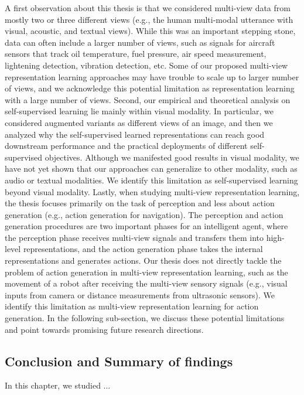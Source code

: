 A first observation about this thesis is that we considered multi-view data from mostly two or three different
views (e.g., the human multi-modal utterance with visual, acoustic, and textual views). While this was
an important stepping stone, data can often include a larger number of views, such as signals for aircraft
sensors that track oil temperature, fuel pressure, air speed measurement, lightening detection, vibration
detection, etc. Some of our proposed multi-view representation learning approaches may have trouble to
scale up to larger number of views, and we acknowledge this potential limitation as representation learning
with a large number of views. Second, our empirical and theoretical analysis on self-supervised learning lie
mainly within visual modality. In particular, we considered augmented variants as different views of an
image, and then we analyzed why the self-supervised learned representations can reach good downstream
performance and the practical deployments of different self-supervised objectives. Although we manifested
good results in visual modality, we have not yet shown that our approaches can generalize to other modality,
such as audio or textual modalities. We identify this limitation as self-supervised learning beyond visual
modality. Lastly, when studying multi-view representation learning, the thesis focuses primarily on the task
of perception and less about action generation (e.g., action generation for navigation). The perception and
action generation procedures are two important phases for an intelligent agent, where the perception phase
receives multi-view signals and transfers them into high-level representations, and the action generation
phase takes the internal representations and generates actions. Our thesis does not directly tackle the
problem of action generation in multi-view representation learning, such as the movement of a robot after
receiving the multi-view sensory signals (e.g., visual inputs from camera or distance measurements from
ultrasonic sensors). We identify this limitation as multi-view representation learning for action generation.
In the following sub-section, we discuss these potential limitations and point towards promising future
research directions.

\subsection{Conclusion and Summary of findings}

In this chapter, we studied ...